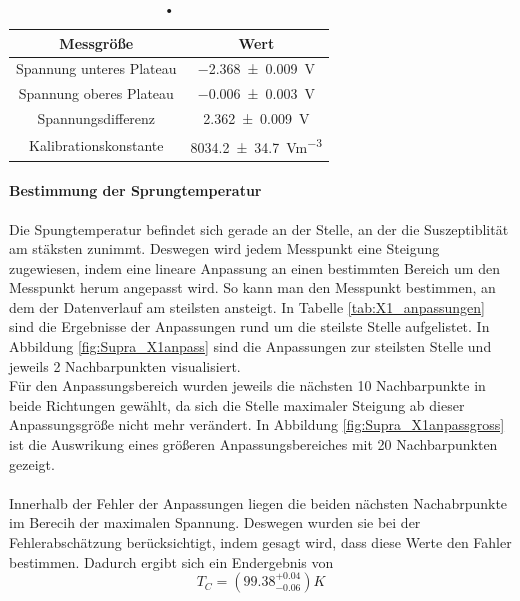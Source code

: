 \documentclass[12pt,a4paper]{article}
\begin{document}
\begin{table}
\centering
\begin{tabular}{|c|c|}
\hline 
Messgröße & Wert \\ 
\hline 
Spannung unteres Plateau & \SI{-2.368\pm 0.009}{V} \\ 
\hline 
Spannung oberes Plateau & \SI{-0.006\pm 0.003}{V} \\ 
\hline 
Spannungsdifferenz & \SI{2.362\pm 0.009}{V} \\ 
\hline 
Kalibrationskonstante & \SI{8034.2\pm 34.7}{Vm^{-3}} \\ 
\hline 
\end{tabular} 
\caption{•}
\label{tab:X1_const}
\end{table}

\paragraph{Bestimmung der Sprungtemperatur}
Die Spungtemperatur befindet sich gerade an der Stelle, an der die Suszeptiblität am stäksten zunimmt. Deswegen wird jedem Messpunkt eine Steigung zugewiesen, indem eine lineare Anpassung an einen bestimmten Bereich um den Messpunkt herum angepasst wird. So kann man den Messpunkt bestimmen, an dem der Datenverlauf am steilsten ansteigt. In Tabelle \ref{tab:X1_anpassungen} sind die Ergebnisse der Anpassungen rund um die steilste Stelle aufgelistet. In Abbildung
\ref{fig:Supra_X1anpass} sind die Anpassungen zur steilsten Stelle und jeweils 2 Nachbarpunkten visualisiert.\\
Für den Anpassungsbereich wurden jeweils die nächsten 10 Nachbarpunkte in beide Richtungen gewählt, da sich die Stelle maximaler Steigung ab dieser Anpassungsgröße nicht mehr verändert. In Abbildung \ref{fig:Supra_X1anpassgross} ist die Auswrikung eines größeren Anpassungsbereiches mit 20 Nachbarpunkten gezeigt.\\
\\
Innerhalb der Fehler der Anpassungen liegen die beiden nächsten Nachabrpunkte im Berecih der maximalen Spannung. Deswegen wurden sie bei der Fehlerabschätzung berücksichtigt, indem gesagt wird, dass diese Werte den Fahler bestimmen. Dadurch ergibt sich ein Endergebnis von
\begin{equation*}
T_C = (99.38^{+0.04}_{-0.06}) K
\end{equation*}
\end{document}
